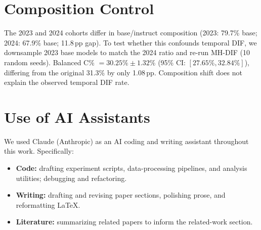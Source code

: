 \begin{table}[h]
\centering
\caption{Temporal DIF computed separately for base-only and instruct-only model subsets. Both model types independently exhibit C\% $\geq 32\%$, far exceeding the random baseline (0.62\%). Training methodology modulates DIF direction ($r$, focal-favoring proportion) rather than magnitude.}
\label{tab:baseinst_temporal}
\small
{}
\end{table}

\section{Composition Control}
\label{app:composition_control}

The 2023 and 2024 cohorts differ in base/instruct composition (2023: 79.7\% base; 2024: 67.9\% base; 11.8\,pp gap). To test whether this confounds temporal DIF, we downsample 2023 base models to match the 2024 ratio and re-run MH-DIF (10 random seeds). Balanced C\% $= 30.25\% \pm 1.32\%$ (95\% CI: $[27.65\%, 32.84\%]$), differing from the original 31.3\% by only 1.08\,pp. Composition shift does not explain the observed temporal DIF rate.

\section{Use of AI Assistants}
\label{app:ai-assistants}

We used Claude (Anthropic) as an AI coding and writing assistant throughout this work. Specifically:
\begin{itemize}
    \item \textbf{Code:} drafting experiment scripts, data-processing pipelines, and analysis utilities; debugging and refactoring.
    \item \textbf{Writing:} drafting and revising paper sections, polishing prose, and reformatting \LaTeX{}.
    \item \textbf{Literature:} summarizing related papers to inform the related-work section.
\end{itemize}

